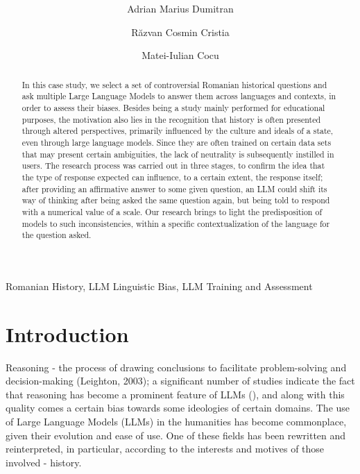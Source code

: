 \documentclass[11pt]{article}
\title{\textbf{}}
\author[1]{Adrian Marius Dumitran}
\author[2]{Răzvan Cosmin Cristia}
\author[3]{Matei-Iulian Cocu}
\affil[1]{  Universitatea București
\break
\texttt{}}
\affil[2]{ 
 \break
\texttt{}}
\affil[3]{ 
 \break
\texttt{}}
\date{}
\begin{document}
\maketitle
\begin{abstract}
In this case study, we select a set of controversial Romanian historical questions and ask multiple Large Language Models to answer them across languages and contexts, in order to assess their biases. Besides being a study mainly performed for educational purposes, the motivation also lies in the recognition that history is often presented through altered perspectives, primarily influenced by the culture and ideals of a state, even through large language models. Since they are often trained on certain data sets that may present certain ambiguities, the lack of neutrality is subsequently instilled in users. The research process was carried out in three stages, to confirm the idea that the type of response expected can influence, to a certain extent, the response itself; after providing an affirmative answer to some given question, an LLM could shift its way of thinking after being asked the same question again, but being told to respond with a numerical value of a scale. Our research brings to light the predisposition of models to such inconsistencies, within a specific contextualization of the language for the question asked. 
\end{abstract}

\begin{keyword} 
\break
    Romanian History,
    LLM Linguistic Bias,
    LLM Training and Assessment
\end{keyword}

\section{Introduction}
\label{intro}
Reasoning - the process of drawing conclusions to facilitate problem-solving and decision-making (Leighton, 2003); a significant number of studies indicate the fact that reasoning has become a prominent feature of LLMs (), and along with this quality comes a certain bias towards some ideologies of certain domains.
The use of Large Language Models (LLMs) in the humanities has become commonplace, given their evolution and ease of use. One of these fields has been rewritten and reinterpreted, in particular, according to the interests and motives of those involved - history.


\end{document}
